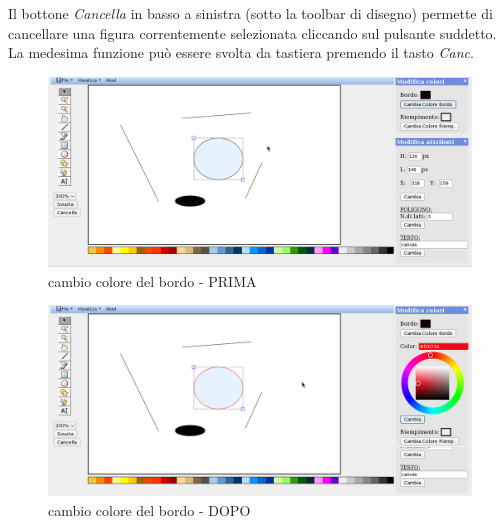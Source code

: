 \vspace{100pt}
Il bottone \textit{Cancella} in basso a sinistra (sotto la toolbar di disegno) permette di cancellare una figura correntemente selezionata cliccando sul pulsante suddetto. La medesima funzione pu\`o essere svolta da tastiera premendo il tasto \textit{Canc}.
 
\begin{figure}[!ht]
\centering
\includegraphics[scale=0.4]{images/colore_bordo_prima.png}
\caption{cambio colore del bordo - PRIMA}
\end{figure}
 
\begin{figure}[!ht]
\centering
\includegraphics[scale=0.4]{images/colore_bordo_dopo.png}
\caption{cambio colore del bordo - DOPO}
\end{figure}
 

